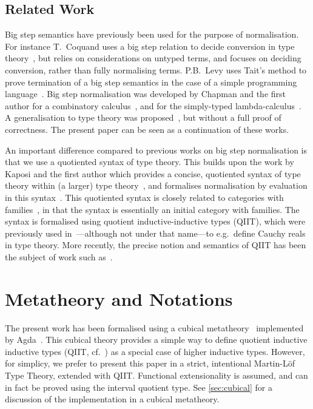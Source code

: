 \documentclass[a4paper,UKenglish,cleveref]{lipics-v2019}
\begin{document}
\subsection{Related Work}
Big step semantics have previously been used for the purpose of normalisation.
For instance T.~Coquand uses a big step relation to decide conversion in type
theory~\cite{coquand1991conversion}, but relies on considerations on untyped
terms, and focuses on deciding conversion, rather than fully normalising terms.
P.B.~Levy uses Tait's method to prove termination of a big step semantics in
the case of a simple programming language~\cite{levy2001call}. Big step
normalisation was developed by Chapman and the first author for a combinatory
calculus~\cite{chapman2006tait}, and for the simply-typed
lambda-calculus~\cite{chapman2009bsn}. A generalisation to type theory was
proposed~\cite{chapman2009type}, but without a full proof of correctness.
The present paper can be seen as a continuation of these works.

An important difference compared to previous works on big step normalisation
is that we use a quotiented syntax of type theory. This builds upon the work by
Kaposi and the first author which provides a concise, quotiented syntax of type
theory within (a larger) type theory~\cite{kaposi2016type}, and formalises
normalisation by evaluation in this syntax~\cite{kaposi2016normalisation}.
This quotiented syntax is closely related to categories with
families~\cite{dybjer1995cwf,hofmann1997syntax}, in that the syntax is
essentially an initial category with families. The syntax is formalised using
quotient inductive-inductive types (QIIT), which were previously used
in~\cite{hott}---although not under that name---to e.g.\ define Cauchy reals
in type theory. More recently, the precise notion and semantics of QIIT has
been the subject of work such
as~\cite{altenkirch2018quotient,dijkstra2017quotient,kaposi2019quotient}.


\section{Metatheory and Notations}
\label{sec:theory}
The present work has been formalised using a cubical metatheory~\cite{cchm}
implemented by Agda~\cite{norell2007agda}. This cubical theory provides a simple
way to define quotient inductive inductive types (QIIT, cf.~\cite{kaposi2016type})
as a special case of higher inductive types. However, for simplicy, we prefer
to present this paper in a strict, intentional Martin-Löf Type Theory,
extended with QIIT. Functional extensionality is assumed, and can in fact be
proved using the interval quotient type. See \cref{sec:cubical} for a
discussion of the implementation in a cubical metatheory.
\end{document}
